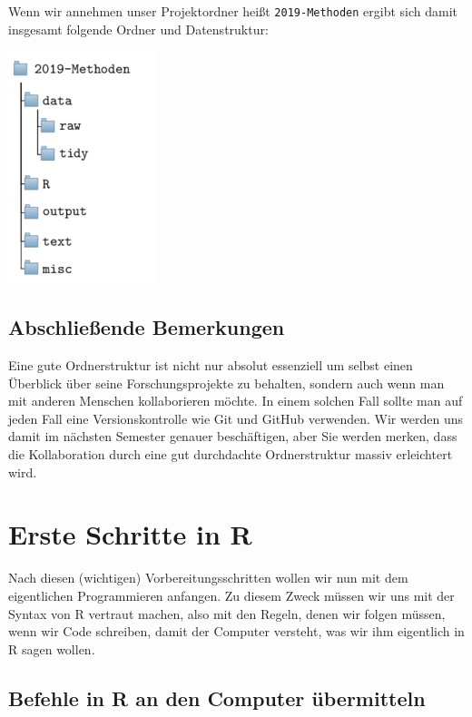 \documentclass[]{book}
\begin{document}
Wenn wir annehmen unser Projektordner heißt \texttt{2019-Methoden}
ergibt sich damit insgesamt folgende Ordner und Datenstruktur:

\begin{center}\includegraphics{figures/wd-structure} \end{center}

\section{Abschließende Bemerkungen}\label{abschlieende-bemerkungen}

Eine gute Ordnerstruktur ist nicht nur absolut essenziell um selbst
einen Überblick über seine Forschungsprojekte zu behalten, sondern auch
wenn man mit anderen Menschen kollaborieren möchte. In einem solchen
Fall sollte man auf jeden Fall eine Versionskontrolle wie Git und GitHub
verwenden. Wir werden uns damit im nächsten Semester genauer
beschäftigen, aber Sie werden merken, dass die Kollaboration durch eine
gut durchdachte Ordnerstruktur massiv erleichtert wird.

\hypertarget{basics}{\chapter{Erste Schritte in R}\label{basics}}

Nach diesen (wichtigen) Vorbereitungsschritten wollen wir nun mit dem
eigentlichen Programmieren anfangen. Zu diesem Zweck müssen wir uns mit
der Syntax von R vertraut machen, also mit den Regeln, denen wir folgen
müssen, wenn wir Code schreiben, damit der Computer versteht, was wir
ihm eigentlich in R sagen wollen.

\section{Befehle in R an den Computer
übermitteln}\label{befehle-in-r-an-den-computer-ubermitteln}
\end{document}
